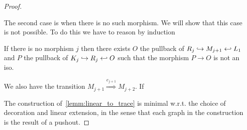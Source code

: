 \begin{proof}
\begin{itemize}
    The second case is when there is no such morphism. We will show that this case is not possible. To do this we have to reason by induction

    If there is no morphism $j$ then there exists $O$ the pullback of $R_j\hookrightarrow M_{j+1}\hookleftarrow L_1$ and $P$ the pullback of $K_j\hookrightarrow R_j\hookleftarrow O$ such that the morphism $P\to O$ is not an iso.

    We also have the transition $M_{j+1}\overset{e_{j+1}}{\Rightarrow} M_{j+2}$. If




  \end{itemize}


  The construction of~\autoref{lemm:linear_to_trace} is minimal w.r.t. the choice of decoration and linear extension, in the sense that each graph in the construction is the result of a pushout.



\end{proof}




\newpage

